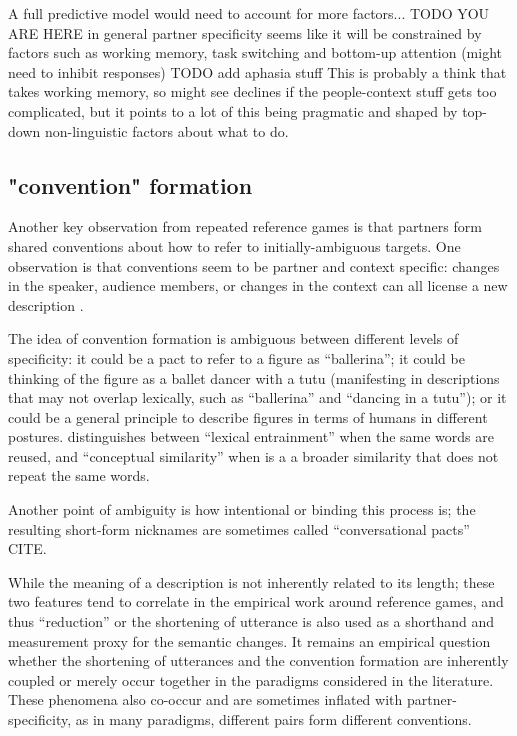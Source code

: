 \documentclass[]{article}
\begin{document}
A full predictive model would need to account for more factors... TODO YOU ARE HERE  in general partner specificity seems like it will be constrained by factors such as working memory, task switching and bottom-up attention (might need to inhibit responses) 
TODO add aphasia stuff 
 This is probably a think that takes working memory, so might see declines if the people-context stuff gets too complicated, but it points to a lot of this being pragmatic and shaped by top-down non-linguistic factors about what to do. 

\subsection{"convention" formation}
Another key observation from repeated reference games is that partners form shared conventions about how to refer to initially-ambiguous targets. One observation is that conventions seem to be partner and context specific: changes in the speaker, audience members, or changes in the context can all license a new description \cite{metzing2003a, ibarra2016, yoon2014}.

The idea of convention formation is ambiguous between different levels of specificity: it could be a pact to refer to a figure as ``ballerina''; it could be thinking of the figure as a ballet dancer with a tutu (manifesting in descriptions that may not overlap lexically, such as ``ballerina'' and ``dancing in a tutu''); or it could be a general principle to describe figures in terms of humans in different postures. 
\cite{horton2002a} distinguishes between ``lexical entrainment'' when the same words are reused, and ``conceptual similarity'' when is a a broader similarity that does not repeat the same words. 

Another point of ambiguity is how intentional or binding this process is; the resulting short-form nicknames are sometimes called ``conversational pacts'' CITE. 

While the meaning of a description is not inherently related to its length; these two features tend to correlate in the empirical work around reference games, and thus ``reduction'' or the shortening of utterance is also used as a shorthand and measurement proxy for the semantic changes. It remains an empirical question whether the shortening of utterances and the convention formation are inherently coupled or merely occur together in the paradigms considered in the literature. These phenomena also co-occur and are sometimes inflated with partner-specificity, as in many paradigms, different pairs form different conventions. 
\end{document}
